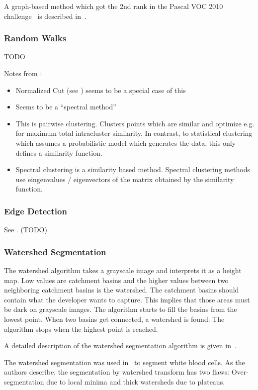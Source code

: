 A graph-based method which got the 2nd rank in the Pascal VOC 2010
challenge~\cite{everingham2010pascal} is described
in~\cite{carreira2010constrained}.


\subsubsection{Random Walks}

TODO

Notes from \cite{meilpa2001learning}:

\begin{itemize}
    \item Normalized Cut (see \cite{shi2000normalized}) seems to be a special
          case of this
    \item Seems to be a \enquote{spectral method}
    \item This is pairwise clustering. Clusters points which are similar and
          optimize e.g. for maximum total intracluster similarity. In contrast,
          to statistical clustering which assumes a probabilistic model which
          generates the data, this only defines a similarity function.
    \item Spectral clustering is a similarity based method. Spectral clustering
          methods use eingenvalues / eigenvectors of the matrix obtained by the
          similarity function.
\end{itemize}


\subsubsection{Edge Detection}

See \cite{kass1988snakes}. (TODO)


\subsubsection{Watershed Segmentation}\label{subsec:watershed}
The watershed algorithm takes a grayscale image and interprets it as a height
map. Low values are catchment basins and the higher values between two
neighboring catchment basins is the watershed. The catchment basins should
contain what the developer wants to capture. This implies that those areas
must be dark on grayscale images. The algorithm starts to fill the basins from
the lowest point. When two basins get connected, a watershed is found. The
algorithm stops when the highest point is reached.

A detailed description of the watershed segmentation algorithm is given
in~\cite{roerdink2000watershed}.

The watershed segmentation was used in~\cite{1260033} to segment white blood
cells. As the authors describe, the segmentation by watershed transform has
two flaws: Over-segmentation due to local minima and thick watersheds due to
plateaus.